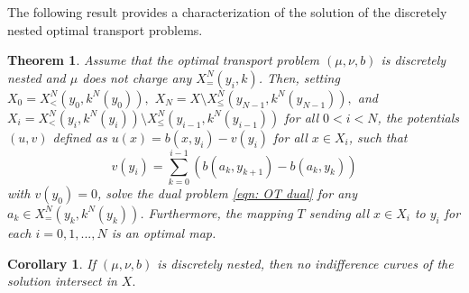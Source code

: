 \documentclass[12pt,reqno]{amsart}
\newtheorem{theorem}{Theorem}
\newtheorem{corollary}{Corollary}
\begin{document}
The following result provides a characterization of the solution of the discretely nested optimal transport problems.
\begin{theorem}\label{nestchar}
Assume that the optimal transport problem $(\mu, \nu, b)$ is discretely nested and $\mu$ does not charge any $X^N_{=}(y_i, k)$. Then, setting $X_0=X^N_{<}(y_0, k^N(y_0)),$ $X_N=X\setminus X^N_{\le}(y_{N-1}, k^N(y_{N-1})),$ and $X_i = X^N_{<}(y_i, k^N(y_i)) \setminus X^N_{\leq}(y_{i-1}, k^N(y_{i-1}))$ for all $0<i<N$, the potentials $(u,v)$ defined as $u(x) = b(x, y_i) - v(y_i)$ for all $x \in X_i$,  such that 
\[
v(y_i) = \sum_{k=0}^{i-1}(b(a_k, y_{k+1}) - b(a_k, y_k))
\]
with $v(y_0) = 0$, solve the dual problem \eqref{eqn: OT dual} for any $a_k \in X^N_{=}(y_k, k^N(y_k))$. Furthermore, the mapping $T$ sending all $x \in X_i$ to $y_i$ for each $i=0,1,...,N$ is an optimal map.
\end{theorem}




    
\begin{corollary}\label{do not intersect}
    If $(\mu,\nu,b)$ is discretely nested, then no indifference curves of the solution intersect in $X.$
\end{corollary}
\end{document}
